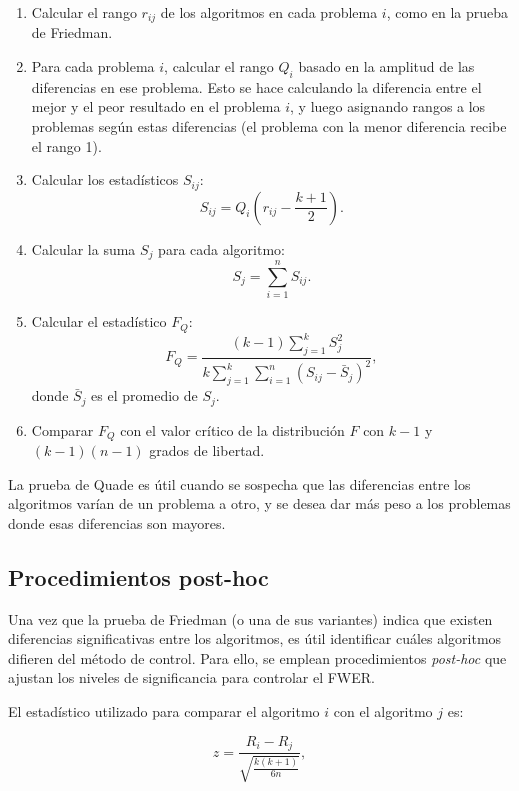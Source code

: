 \begin{enumerate}
    \item Calcular el rango $r_{ij}$ de los algoritmos en cada problema $i$, como en la prueba de Friedman.

    \item Para cada problema $i$, calcular el rango $Q_i$ basado en la amplitud de las diferencias en ese problema. Esto se hace calculando la diferencia entre el mejor y el peor resultado en el problema $i$, y luego asignando rangos a los problemas según estas diferencias (el problema con la menor diferencia recibe el rango 1).

    \item Calcular los estadísticos $S_{ij}$:
    \[
    S_{ij} = Q_i \left( r_{ij} - \frac{k+1}{2} \right).
    \]

    \item Calcular la suma $S_j$ para cada algoritmo:
    \[
    S_j = \sum_{i=1}^{n} S_{ij}.
    \]

    \item Calcular el estadístico $F_Q$:
    \[
    F_Q = \frac{(k - 1) \sum_{j=1}^{k} S_j^2}{k \sum_{j=1}^{k} \sum_{i=1}^{n} (S_{ij} - \bar{S}_j)^2},
    \]
    donde $\bar{S}_j$ es el promedio de $S_{j}$.

    \item Comparar $F_Q$ con el valor crítico de la distribución $F$ con $k-1$ y $(k-1)(n-1)$ grados de libertad.
\end{enumerate}

La prueba de Quade es útil cuando se sospecha que las diferencias entre los algoritmos varían de un problema a otro, y se desea dar más peso a los problemas donde esas diferencias son mayores.

\subsection{Procedimientos post-hoc}
\label{sec:procedimientos_posthoc}

Una vez que la prueba de Friedman (o una de sus variantes) indica que existen diferencias significativas entre los algoritmos, es útil identificar cuáles algoritmos difieren del método de control. Para ello, se emplean procedimientos \textit{post-hoc} que ajustan los niveles de significancia para controlar el FWER.

El estadístico utilizado para comparar el algoritmo $i$ con el algoritmo $j$ es:

\[
z = \frac{R_i - R_j}{\sqrt{\frac{k(k+1)}{6n}}},
\]

